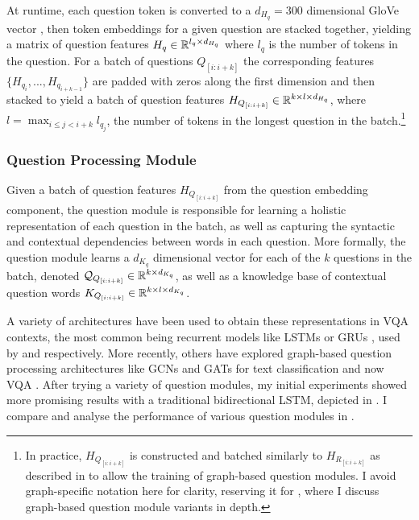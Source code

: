 At runtime, each question token is converted to a \(d_{H_q} = 300\) dimensional GloVe vector \cite{pennington2014glove}, then token embeddings for a given question are stacked together, yielding a matrix of question features \(H_q \in \mathbb{R}^{l_q \times d_{H_q}}\) where \(l_q\) is the number of tokens in the question. For a batch of questions \(Q_{[i:i+k]}\) the corresponding features \(\{H_{q_i}, ..., H_{q_{i+k-1}}\}\) are padded with zeros along the first dimension and then stacked to yield a batch of question features \(H_{Q_{[i:i+k]}} \in \mathbb{R}^{k \times l \times d_{H_q}}\), where \(l = \max_{i \leq j < i+k} l_{q_j}\), the number of tokens in the longest question in the batch.\footnote{In practice, \(H_{Q_{[i:i+k]}}\) is constructed and batched similarly to \(H_{R_{[i:i+k]}}\) as described in \subsectionautorefname{ \ref{sec:scene_graph_embedding_details}} to allow the training of graph-based question modules. I avoid graph-specific notation here for clarity, reserving it for \subsectionautorefname{ \ref{subsec:question_module_ablations}}, where I discuss graph-based question module variants in depth.}

\subsubsection{Question Processing Module}

Given a batch of question features \(H_{Q_{[i:i+k]}}\) from the question embedding component, the question module is responsible for learning a holistic representation of each question in the batch, as well as capturing the syntactic and contextual dependencies between words in each question. More formally, the question module learns a \(d_{K_q}\) dimensional vector for each of the \(k\) questions in the batch, denoted \(\mathcal{Q}_{Q_{[i:i+k]}} \in \mathbb{R}^{k \times d_{K_q}}\), as well as a knowledge base of contextual question words \(K_{Q_{[i:i+k]}} \in \mathbb{R}^{k \times l \times d_{K_q}}\).

A variety of architectures have been used to obtain these representations in VQA contexts, the most common being recurrent models like LSTMs \cite{hochreiter1997long} or GRUs \cite{cho2014learning}, used by \cite{perez2017film, hudson2018compositional, lu2016hierarchical, yu2019deep} and \cite{anderson2018bottom, teney2018tips, li2019relation, liu2019densely, gao2019dynamic, kim2018bilinear} respectively. More recently, others have explored graph-based question processing architectures like GCNs and GATs for text classification \cite{yao2019graph, liu2020tensor} and now VQA \cite{huang2020aligned}. After trying a variety of question modules, my initial experiments showed more promising results with a traditional bidirectional LSTM, depicted in \figureautorefname{ \ref{fig:question_module_bilstm}}. I compare and analyse the performance of various question modules in \subsectionautorefname{ \ref{subsec:question_module_ablations}}.

